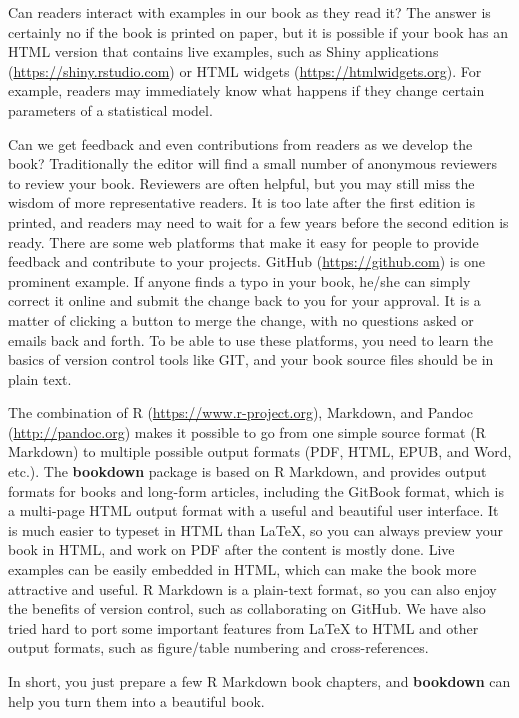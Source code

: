 \documentclass[
  12pt,
]{krantz}
\begin{document}
Can readers interact with examples in our book as they read it? The answer is certainly no if the book is printed on paper, but it is possible if your book has an HTML version that contains live examples, such as Shiny applications (\url{https://shiny.rstudio.com}) or HTML widgets (\url{https://htmlwidgets.org}). For example, readers may immediately know what happens if they change certain parameters of a statistical model.

Can we get feedback and even contributions from readers as we develop the book? Traditionally the editor will find a small number of anonymous reviewers to review your book. Reviewers are often helpful, but you may still miss the wisdom of more representative readers. It is too late after the first edition is printed, and readers may need to wait for a few years before the second edition is ready. There are some web platforms that make it easy for people to provide feedback and contribute to your projects. GitHub (\url{https://github.com}) is one prominent example. If anyone finds a typo in your book, he/she can simply correct it online and submit the change back to you for your approval. It is a matter of clicking a button to merge the change, with no questions asked or emails back and forth. To be able to use these platforms, you need to learn the basics of version control tools like GIT, and your book source files should be in plain text.

The combination of R (\url{https://www.r-project.org}), Markdown, and Pandoc (\url{http://pandoc.org}) makes it possible to go from one simple source format (R Markdown) to multiple possible output formats (PDF, HTML, EPUB, and Word, etc.). The \textbf{bookdown} package is based on R Markdown, and provides output formats for books and long-form articles, including the GitBook format, which is a multi-page HTML output format with a useful and beautiful user interface. It is much easier to typeset in HTML than LaTeX, so you can always preview your book in HTML, and work on PDF after the content is mostly done. Live examples can be easily embedded in HTML, which can make the book more attractive and useful. R Markdown is a plain-text format, so you can also enjoy the benefits of version control, such as collaborating on GitHub. We have also tried hard to port some important features from LaTeX to HTML and other output formats, such as figure/table numbering and cross-references.

In short, you just prepare a few R Markdown book chapters, and \textbf{bookdown} can help you turn them into a beautiful book.
\end{document}
